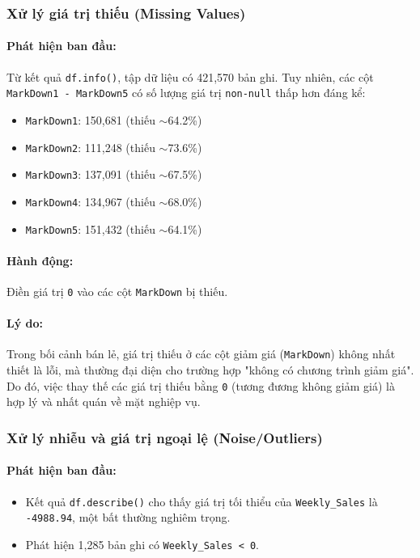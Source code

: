 \subsubsection{Xử lý giá trị thiếu (Missing Values)}

\paragraph{Phát hiện ban đầu:} 
Từ kết quả \texttt{df.info()}, tập dữ liệu có 421,570 bản ghi. Tuy nhiên, các cột \texttt{MarkDown1 - MarkDown5} có số lượng giá trị \texttt{non-null} thấp hơn đáng kể:

\begin{itemize}
    \item \texttt{MarkDown1}: 150,681 (thiếu $\sim$64.2\%)
    \item \texttt{MarkDown2}: 111,248 (thiếu $\sim$73.6\%)
    \item \texttt{MarkDown3}: 137,091 (thiếu $\sim$67.5\%)
    \item \texttt{MarkDown4}: 134,967 (thiếu $\sim$68.0\%)
    \item \texttt{MarkDown5}: 151,432 (thiếu $\sim$64.1\%)
\end{itemize}

\paragraph{Hành động:} 
Điền giá trị \texttt{0} vào các cột \texttt{MarkDown} bị thiếu.

\paragraph{Lý do:} 
Trong bối cảnh bán lẻ, giá trị thiếu ở các cột giảm giá (\texttt{MarkDown}) không nhất thiết là lỗi, mà thường đại diện cho trường hợp "không có chương trình giảm giá". Do đó, việc thay thế các giá trị thiếu bằng \texttt{0} (tương đương không giảm giá) là hợp lý và nhất quán về mặt nghiệp vụ.

\subsubsection{Xử lý nhiễu và giá trị ngoại lệ (Noise/Outliers)}

\paragraph{Phát hiện ban đầu:} 
\begin{itemize}
    \item Kết quả \texttt{df.describe()} cho thấy giá trị tối thiểu của \texttt{Weekly\_Sales} là \texttt{-4988.94}, một bất thường nghiêm trọng.
    \item Phát hiện 1,285 bản ghi có \texttt{Weekly\_Sales < 0}.
\end{itemize}


